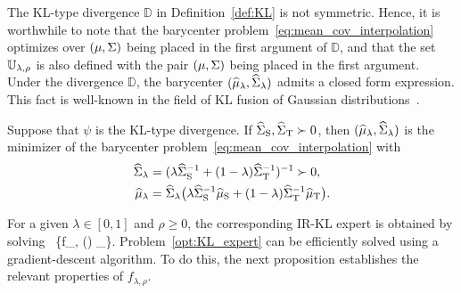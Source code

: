\documentclass{article}
\begin{document}
The KL-type divergence $\mathds D$ in Definition~\ref{def:KL} is not symmetric. Hence, it is worthwhile to note that the barycenter problem~\eqref{eq:mean_cov_interpolation} optimizes over $(\mu, \Sigma)$ being placed in the first argument of $\mathds D$, and that the set $\mathbb U_{\lambda, \rho}$ is also defined with the pair $(\mu, \Sigma)$ being placed in the first argument. Under the divergence $\mathds D$, the barycenter $(\widehat {\mu}_\lambda, \widehat{\Sigma}_\lambda)$ admits a closed form expression. This fact is well-known in the field of KL fusion of Gaussian distributions~\cite{ref:battistelli2013consensus}. 
\begin{proposition}[KL barycenter]
\label{prop:kl_interpolation}
Suppose that  $\psi $ is the KL-type divergence.
If $\widehat {\Sigma}_{\rm S}, \widehat {\Sigma}_{\rm T} \succ 0$, then $(\widehat {\mu}_\lambda, \widehat{\Sigma}_\lambda)$ is the minimizer of the barycenter problem~\eqref{eq:mean_cov_interpolation} with
\begin{align*}
            \widehat \Sigma_\lambda &= (\lambda \widehat{\Sigma}_{\rm S}^{-1} + (1-\lambda) \widehat{\Sigma}_{\rm T}^{-1})^{-1} \succ 0,\\
            \widehat \mu_\lambda &= \widehat{\Sigma}_\lambda \big( \lambda \widehat{\Sigma}_{\rm S}^{-1} \widehat {\mu}_{\rm S} + (1-\lambda) \widehat{\Sigma}_{\rm T}^{-1} \widehat {\mu}_{\rm T} \big).
\end{align*}
\end{proposition}


For a given $\lambda \in [0, 1]$ and $\rho \ge 0$, the corresponding IR-KL expert is obtained by solving
    \be  
    \label{opt:KL_expert}
        ~\left\{f_{\lambda, \rho}(\beta) \Let
         \EE_ \right\}.
    \ee
Problem~\eqref{opt:KL_expert} can be efficiently solved using a gradient-descent algorithm. To do this, the next proposition establishes the relevant properties of $f_{\lambda, \rho}$.
\end{document}
